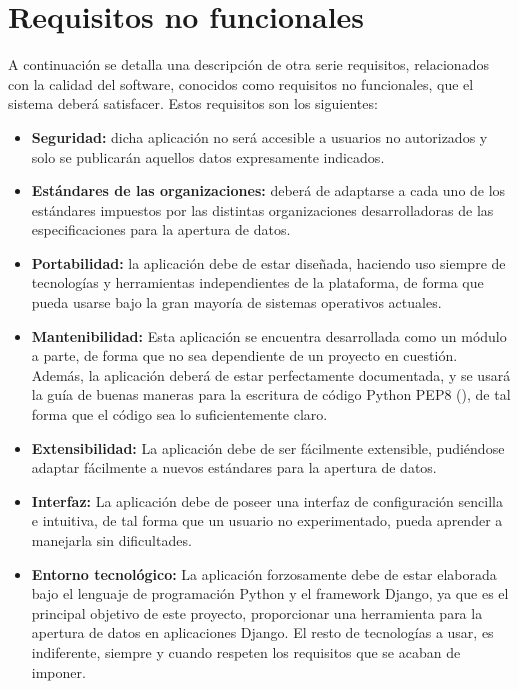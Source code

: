 \section{Requisitos no funcionales}
\label{sec:RQNF}

A continuación se detalla una descripción de otra serie requisitos, relacionados
con la calidad del software, conocidos como requisitos no funcionales, que el
sistema deberá satisfacer. Estos requisitos son los siguientes:
\begin{itemize}
    \item \textbf{Seguridad:} dicha aplicación no será accesible a usuarios no
           autorizados y solo se publicarán aquellos datos expresamente
           indicados.
    \item \textbf{Estándares de las organizaciones:} deberá de adaptarse a
           cada uno de los estándares impuestos por las distintas organizaciones
           desarrolladoras de las especificaciones para la apertura de datos.
    \item \textbf{Portabilidad:} la aplicación debe de estar diseñada,
           haciendo uso siempre de tecnologías y herramientas independientes de
           la plataforma, de forma que pueda usarse bajo la gran mayoría de
           sistemas operativos actuales.
    \item \textbf{Mantenibilidad:} Esta aplicación se encuentra desarrollada
           como un módulo a parte, de forma que no sea dependiente de un
           proyecto en cuestión. Además, la aplicación deberá de estar
           perfectamente documentada, y se usará la guía de buenas maneras para
           la escritura de código Python PEP8 (\cite{pep8}), de tal forma que
           el código sea lo suficientemente claro.
    \item \textbf{Extensibilidad:} La aplicación debe de ser fácilmente
           extensible, pudiéndose adaptar fácilmente a nuevos estándares para la
           apertura de datos.
    \item \textbf{Interfaz:} La aplicación debe de poseer una interfaz de
           configuración sencilla e intuitiva, de tal forma que un usuario no
           experimentado, pueda aprender a manejarla sin dificultades.
    \item \textbf{Entorno tecnológico:} La aplicación forzosamente debe de
           estar elaborada bajo el lenguaje de programación Python y el
           framework Django, ya que es el principal objetivo de este proyecto,
           proporcionar una herramienta para la apertura de datos en
           aplicaciones Django. El resto de tecnologías a usar, es indiferente,
           siempre y cuando respeten los requisitos que se acaban de imponer.
\end{itemize}


